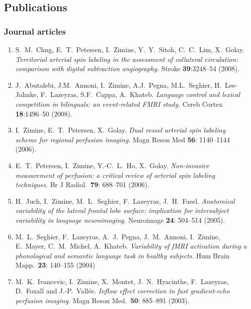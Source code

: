 \documentclass[a4paper,11pt,oneside]{article}
\begin{document}
\subsection*{Publications}

\subsubsection*{Journal articles}

\begin{enumerate}

\item S.~M.~Chng, E.~T.~Petersen, I.~Zimine, Y.~Y.~Sitoh, C.~C.~Lim, X.~Golay.
\textit{Territorial arterial spin labeling in the assessment of collateral
circulation: comparison with digital subtraction angiography.} Stroke
\textbf{39}:3248--54 (2008).

\item J.~Abutalebi, J.M.~Annoni, I.~Zimine, A.J.~Pegna, M.L.~Seghier, 
H.~Lee-Jahnke, F.~Lazeyras, S.F.~Cappa, A.~Khateb. 
\textit{Language control and lexical competition in bilinguals: 
an event-related FMRI study.} Cereb Cortex \textbf{18}:1496--50 (2008).

\item I.~Zimine, E.~T.~Petersen, X.~Golay.
\textit{Dual vessel arterial spin labeling scheme for regional perfusion
imaging.} Magn Reson Med \textbf{56}: 1140--1144 (2006).

\item E.~T.~Petersen, I.~Zimine, Y.-C.~L.~Ho, X.~Golay.
\textit{Non-invasive measurement of perfusion: a critical review of
arterial spin labeling techniques.}
Br J Radiol.\ \textbf{79}: 688--701 (2006).

\item H.~Juch, I.~Zimine, M.~L.~Seghier, F.~Lazeyras, J.~H.~Fasel.
\textit{Anatomical variability of the lateral frontal lobe surface:
implication for intersubject variability in language neuroimaging.}
Neuroimage \textbf{24}: 504--514 (2005).

\item  M.~L.~Seghier, F.~Lazeyras, A.~J.~Pegna, J.~M.~Annoni,
I.~Zimine, E.~Mayer, C.~M.~Michel, A.~Khateb.
\textit{Variability of fMRI activation during a phonological and
semantic language task in healthy subjects.} Hum Brain Mapp.\ 
\textbf{23}: 140--155 (2004)

\item M.~K.~Ivancevic, I.~Zimine, X.~Montet, J.~N.~Hyacinthe,
F.~Lazeyras, D.~Foxall and J.-P.~Vall\'{e}e.
\textit{Inflow effect correction in fast gradient-echo perfusion
imaging.} Magn Reson Med.\ \textbf{50}: 885--891 (2003).


\end{enumerate}
\end{document}
